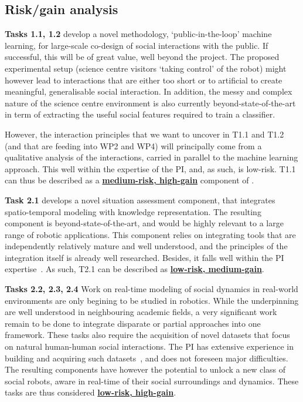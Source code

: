 \subsection{Risk/gain analysis}


\textbf{Tasks 1.1, 1.2} develop a novel methodology, `public-in-the-loop' machine
learning, for large-scale co-design of social interactions with the public. If
successful, this will be of great value, well beyond the project. The
proposed experimental setup (science centre visitors `taking control' of the robot)
might however lead to interactions that are either too short or to artificial to
create meaningful, generalisable social interaction. In addition, the messy and
complex nature of the science centre environment is also currently beyond-state-of-the-art
in term of extracting the useful social features required to train a classifier.

However, the interaction principles that we want to uncover in T1.1 and T1.2
(and that are feeding into WP2 and WP4) will principally come from a qualitative
analysis of the interactions, carried in parallel to the machine learning
approach. This well within the expertise of the PI, and, as such, is low-risk.
T1.1 can thus be described as a \ul{\bf medium-risk, high-gain} component of
\project.

\vspace{1em}

\textbf{Task 2.1} develops a novel situation assessment component, that
integrates spatio-temporal modeling with knowledge representation. The resulting
component is beyond-state-of-the-art, and would be highly relevant to a large range
of robotic applications. This component relies on integrating tools that are
independently relatively mature and well understood, and the principles of the
integration itself is already well researched. Besides, it falls well within the
PI
expertise~\cite{lemaignan2018underworlds,sallami2019simulation,lemaignan2010oro}.
As such, T2.1 can be described as \ul{\bf low-risk, medium-gain}.

\textbf{Tasks 2.2, 2.3, 2.4} Work on real-time modeling of social dynamics in
real-world environments are only begining to be studied in robotics. While the
underpinning are well understood in neighbouring academic fields, a very
significant work remain to be done to integrate disparate or partial approaches
into one framework. These tasks also require the acquisition of novel datasets
that focus on natural human-human social interactions. The PI has extensive
experience in building and acquiring such
datasets~\cite{lemaignan2018pinsoro,sallami2020unexpected}, and does not
foreseen major difficulties. The resulting components have however the potential
to unlock a new class of social robots, aware in real-time of their social
surroundings and dynamics.  These tasks are thus considered \ul{\bf low-risk,
high-gain}.

